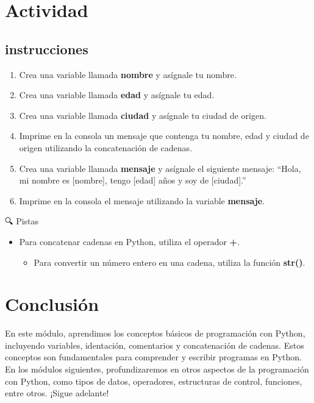 \documentclass[
  a4paper,
  DIV=11,
  numbers=noendperiod,
  onepage,
  openany]{scrreprt}
\providecommand{\tightlist}{%
  \setlength{\itemsep}{0pt}\setlength{\parskip}{0pt}}\usepackage{longtable,booktabs,array}
\begin{document}
\chapter{Actividad}\label{actividad}

\section{instrucciones}\label{instrucciones}

\begin{enumerate}
\def\labelenumi{\arabic{enumi}.}
\item
  Crea una variable llamada \textbf{nombre} y asígnale tu nombre.
\item
  Crea una variable llamada \textbf{edad} y asígnale tu edad.
\item
  Crea una variable llamada \textbf{ciudad} y asígnale tu ciudad de
  origen.
\item
  Imprime en la consola un mensaje que contenga tu nombre, edad y ciudad
  de origen utilizando la concatenación de cadenas.
\item
  Crea una variable llamada \textbf{mensaje} y asígnale el siguiente
  mensaje: ``Hola, mi nombre es {[}nombre{]}, tengo {[}edad{]} años y
  soy de {[}ciudad{]}.''
\item
  Imprime en la consola el mensaje utilizando la variable
  \textbf{mensaje}.
\end{enumerate}

🔍 Pistas

\begin{itemize}
\tightlist
\item
  Para concatenar cadenas en Python, utiliza el operador \textbf{+}.

  \begin{itemize}
  \tightlist
  \item
    Para convertir un número entero en una cadena, utiliza la función
    \textbf{str()}.
  \end{itemize}
\end{itemize}

\chapter{Conclusión}\label{conclusiuxf3n-1}

En este módulo, aprendimos los conceptos básicos de programación con
Python, incluyendo variables, identación, comentarios y concatenación de
cadenas. Estos conceptos son fundamentales para comprender y escribir
programas en Python. En los módulos siguientes, profundizaremos en otros
aspectos de la programación con Python, como tipos de datos, operadores,
estructuras de control, funciones, entre otros. ¡Sigue adelante!
\end{document}
